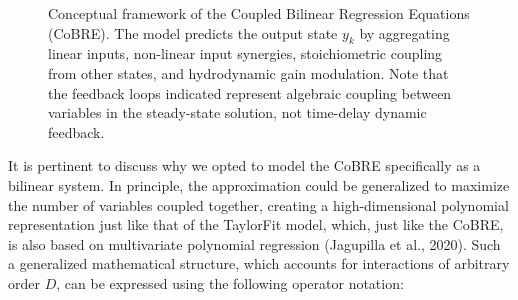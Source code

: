 \documentclass{article}
\begin{document}
\begin{figure}[h]
\centering
{}
\caption{Conceptual framework of the Coupled Bilinear Regression Equations (CoBRE). The model predicts the output state $y_{k}$ by aggregating linear inputs, non-linear input synergies, stoichiometric coupling from other states, and hydrodynamic gain modulation. Note that the feedback loops indicated represent algebraic coupling between variables in the steady-state solution, not time-delay dynamic feedback.}
\label{fig:cobre-conceptual}
\end{figure}

It is pertinent to discuss why we opted to model the CoBRE specifically as a bilinear system. In principle, the approximation could be generalized to maximize the number of variables coupled together, creating a high-dimensional polynomial representation just like that of the TaylorFit model, which, just like the CoBRE, is also based on multivariate polynomial regression (Jagupilla et al., 2020). Such a generalized mathematical structure, which accounts for interactions of arbitrary order $D$, can be expressed using the following operator notation:
\end{document}
